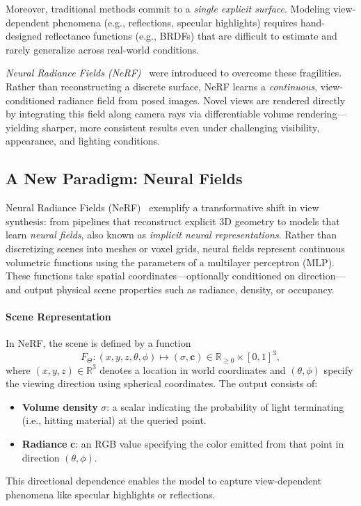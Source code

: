 Moreover, traditional methods commit to a \emph{single explicit surface}. Modeling view-dependent phenomena (e.g., reflections, specular highlights) requires hand-designed reflectance functions (e.g., BRDFs) that are difficult to estimate and rarely generalize across real-world conditions.

\emph{Neural Radiance Fields (NeRF)}~\cite{mildenhall2020_nerf,nerf_survey2023} were introduced to overcome these fragilities. Rather than reconstructing a discrete surface, NeRF learns a \emph{continuous}, view-conditioned radiance field from posed images. Novel views are rendered directly by integrating this field along camera rays via differentiable volume rendering—yielding sharper, more consistent results even under challenging visibility, appearance, and lighting conditions.

\subsection{A New Paradigm: Neural Fields}
\label{subsec:chapter23_nerf_neuralfields}

Neural Radiance Fields (NeRF)~\cite{mildenhall2020_nerf} exemplify a transformative shift in view synthesis: from pipelines that reconstruct explicit 3D geometry to models that learn \emph{neural fields}, also known as \emph{implicit neural representations}. Rather than discretizing scenes into meshes or voxel grids, neural fields represent continuous volumetric functions using the parameters of a multilayer perceptron (MLP). These functions take spatial coordinates—optionally conditioned on direction—and output physical scene properties such as radiance, density, or occupancy.

\paragraph{Scene Representation}
In NeRF, the scene is defined by a function
\[
F_\Theta : (x, y, z, \theta, \phi) \mapsto (\sigma, \mathbf{c}) \in \mathbb{R}_{\geq 0} \times [0,1]^3,
\]
where \((x, y, z)\in\mathbb{R}^3\) denotes a location in world coordinates and \((\theta, \phi)\) specify the viewing direction using spherical coordinates. The output consists of:
\begin{itemize}
    \item \textbf{Volume density} \(\sigma\): a scalar indicating the probability of light terminating (i.e., hitting material) at the queried point.
    \item \textbf{Radiance} \(\mathbf{c}\): an RGB value specifying the color emitted from that point in direction \((\theta, \phi)\).
\end{itemize}
This directional dependence enables the model to capture view-dependent phenomena like specular highlights or reflections.

